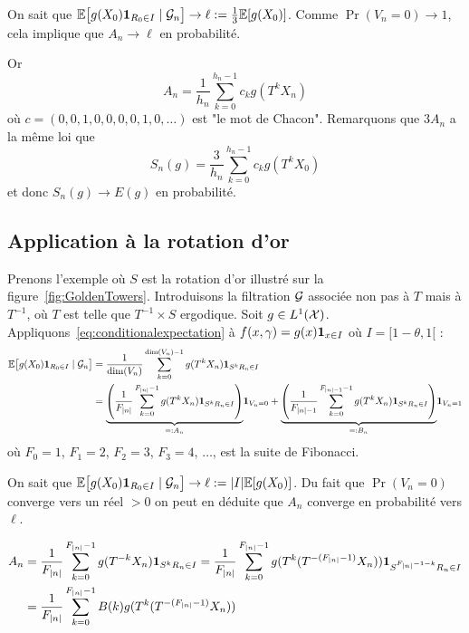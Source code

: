 \documentclass[12pt,a4paper]{article}
\begin{document}
On sait que 
$\mathbb{E}\bigl[g(X_0) \boldsymbol 1_{R_0 \in I} \mid \mathcal{G}_n\bigr] \to \ell:= \frac{1}{3}\mathbb{E}[g(X_0)]$. 
Comme $\Pr(V_n=0) \to 1$, cela implique que $A_n \to \ell$ en probabilité. 

Or 
$$
A_n = \frac{1}{h_n}\sum_{k=0}^{h_n-1} c_k g(T^kX_n) 
$$
où $c = (0, 0, 1, 0, 0, 0, 0, 1, 0, \ldots)$ est "le mot de Chacon". 
Remarquons que $3A_n$ a la même loi que 
$$
S_n(g) = \frac{3}{h_n}\sum_{k=0}^{h_n-1} c_k g(T^kX_0)
$$ 
et donc $S_n(g) \to E(g)$ en probabilité. 

\subsection{Application à la rotation d'or}

Prenons l'exemple où $S$ est la rotation d'or illustré sur la figure~\ref{fig:GoldenTowers}. 
Introduisons la filtration $\mathcal{G}$ associée non pas à $T$ mais à $T^{-1}$, où 
$T$ est telle que $T^{-1} \times S$ ergodique. 
Soit $g \in L^1(\mathcal{X})$. 
Appliquons~\eqref{eq:conditionalexpectation} à 
$f(x,\gamma) = g(x)\boldsymbol 1_{x \in I}$ où $I=[1-\theta, 1[$ :
\begin{align*}
\mathbb{E}\bigl[g(X_0) \boldsymbol 1_{R_0 \in I} \mid \mathcal{G}_n\bigr]
&  = \frac{1}{\dim(V_n)}\sum_{k=0}^{\dim(V_n)-1} g(T^kX_n) \boldsymbol 1_{S^k R_n \in I} \\
& = \underset{=:A_n}{\underbrace{\left(\frac{1}{F_{|n|}}\sum_{k=0}^{F_{|n|}-1} g(T^kX_n) \boldsymbol 1_{S^k R_n \in I}\right)}}\boldsymbol 1_{V_n=0} 
+ \underset{=:B_n}{\underbrace{\left(\frac{1}{F_{|n|-1}}\sum_{k=0}^{F_{|n|-1}-1} g(T^kX_n) \boldsymbol 1_{S^k R_n \in I}\right)}}\boldsymbol 1_{V_n=1}
\end{align*}
où $F_0=1$, $F_1=2$, $F_2=3$, $F_3=4$, $\ldots$, est la suite de Fibonacci. 

On sait que 
$\mathbb{E}\bigl[g(X_0) \boldsymbol 1_{R_0 \in I} \mid \mathcal{G}_n\bigr] \to \ell:= |I|\mathbb{E}[g(X_0)]$. 
Du fait que $\Pr(V_n=0)$ converge vers un réel $>0$ on peut en 
déduite que $A_n$ converge en probabilité vers $\ell$. 

%

\begin{align*}
A_n & = \frac{1}{F_{|n|}}\sum_{k=0}^{F_{|n|}-1} g(T^{-k}X_n) \boldsymbol 1_{S^k R_n \in I}
  = \frac{1}{F_{|n|}}\sum_{k=0}^{F_{|n|}-1} g(T^k(T^{-(F_{|n|}-1)}X_n)) \boldsymbol 1_{S^{F_{|n|}-1-k} R_n \in I} 
 \\ & = \frac{1}{F_{|n|}}\sum_{k=0}^{F_{|n|}-1} B(k) g(T^k(T^{-(F_{|n|}-1)}X_n)) 
\end{align*}
\end{document}
